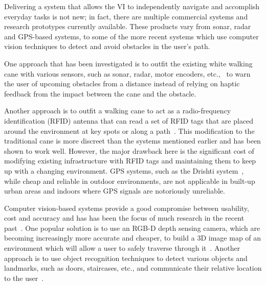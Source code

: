 \documentclass[format=sigconf, review=true, screen=true, anonymous=true]{acmart}
\begin{document}

Delivering a system that allows the VI to independently navigate and accomplish everyday tasks is not new; in fact, there are multiple commercial systems and research prototypes currently available. These products vary from sonar, radar and GPS-based systems, to some of the more recent systems which use computer vision techniques to detect and avoid obstacles in the user's path. 

One approach that has been investigated is to outfit the existing white walking cane with various sensors, such as sonar, radar, motor encoders, etc.,~\cite{ulrich1997, marion2008batcane} to warn the user of upcoming obstacles from a distance instead of relying on haptic feedback from the impact between the cane and the obstacle. %

Another approach is to outfit a walking cane to act as a radio-frequency identification (RFID) antenna that can read a set of RFID tags that are placed around the environment at key spots or along a path~\cite{faria2010electronic, willis2005}. This modification to the traditional cane is more discreet than the systems mentioned earlier and has been shown to work well. However, the major drawback here is the significant cost of modifying existing infrastructure with RFID tags and maintaining them to keep up with a changing environment. GPS systems, such as the Drishti system~\cite{ran2004drishti}, while cheap and reliable in outdoor environments, are not applicable in built-up urban areas and indoors where GPS signals are notoriously unreliable. 

Computer vision-based systems provide a good compromise between usability, cost and accuracy and has has been the focus of much research in the recent past~\cite{manduchi2014last}. One popular solution is to use an RGB-D depth sensing camera, which are becoming increasingly more accurate and cheaper, to build a 3D image map of an environment which will allow a user to safely traverse through it~\cite{lee2015, rodriguez2012obstacle}. Another approach is to use object recognition techniques to detect various objects and landmarks, such as doors, staircases, etc., and communicate their relative location to the user~\cite{tian2013b}.%
\end{document}
